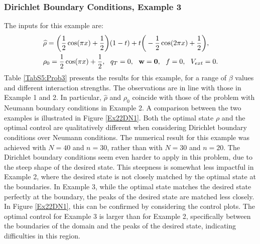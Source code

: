 \subsubsection{Dirichlet Boundary Conditions, Example 3} 
The inputs for this example are:
\begin{align*}
&\widehat \rho = \bigg(\frac{1}{2}\cos(\pi x) + \frac{1}{2}\bigg)(1-t) + t\bigg(-\frac{1}{2}\cos(2 \pi x) + \frac{1}{2}\bigg),\\
&\rho_{0} = \frac{1}{2}\cos(\pi x) + \frac{1}{2},\ \
q_{T} = 0,\ \
\mathbf{w} = \mathbf{0},\ \
f =0,\ \
V_{ext} =0.
\end{align*}
Table \ref{TabS5:Prob3} presents the results for this example, for a range of $\beta$ values and different interaction strengths. The observations are in line with those in Example 1 and 2. In particular, $ \widehat \rho$ and $\rho_0$ coincide with those of the problem with Neumann boundary conditions in Example 2. A comparison between the two examples is illustrated in Figure \ref{Ex22DN1}. Both the optimal state $\rho$ and the optimal control are qualitatively different when considering Dirichlet boundary conditions over Neumann conditions. The numerical result for this example was achieved with $N=40$ and $n = 30$, rather than with $N=30$ and $n=20$. The Dirichlet boundary conditions seem even harder to apply in this problem, due to the steep shape of the desired state. This steepness is somewhat less impactful in Example 2, where the desired state is not closely matched by the optimal state at the boundaries. In Example 3, while the optimal state matches the desired state perfectly at the boundary, the peaks of the desired state are matched less closely. In Figure \ref{Ex22DN1}, this can be confirmed by considering the control plots. The optimal control for Example 3 is larger than for Example 2, specifically between the boundaries of the domain and the peaks of the desired state, indicating difficulties in this region.


